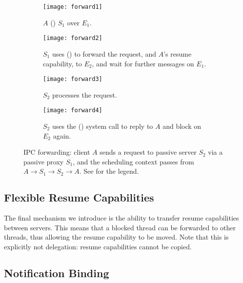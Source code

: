 \begin{figure}
    \centering
    \begin{subfigure}[h]{0.8\textwidth}
        \centering
        \texttt{[image: forward1]}
        \caption{$A$ \call() $S_{1}$ over $E_{1}$.}
        \label{f:forward1}
    \end{subfigure}
    \begin{subfigure}[h]{0.8\textwidth}
        \centering
        \texttt{[image: forward2]}
        \caption{$S_{1}$ uses \nbsendrecv() to forward the request, and $A$'s resume 
            capability, to $E_{2}$, and
        wait for further messages on $E_{1}$.}
        \label{f:forward2}
    \end{subfigure}
    \begin{subfigure}[h]{0.8\textwidth}
        \centering
        \texttt{[image: forward3]}
        \caption{$S_{2}$ processes the request.}
        \label{f:forward3}
    \end{subfigure}
    \begin{subfigure}[h]{0.8\textwidth}
        \centering
        \texttt{[image: forward4]}
        \caption{$S_{2}$ uses the \replyrecv() system call to reply to $A$ and block on
        $E_{2}$ again. }
        \label{f:forward4}
\end{subfigure}
\caption[IPC forwarding.]{IPC forwarding: client $A$ sends a request to passive server $S_{2}$ via a passive proxy $S_{1}$,
and the scheduling context passes from $A \rightarrow S_{1} \rightarrow S_{2} \rightarrow A$. See  for the legend.}
\label{f:model-forward}
\end{figure}

\subsection{Flexible Resume Capabilities}

The final mechanism we introduce is the ability to transfer resume capabilities between servers. 
This means that a blocked thread can be forwarded to other threads, thus allowing the resume
capability to be moved. Note that this is explicitly not delegation: resume capabilities cannot be
copied.

\subsection{Notification Binding}

